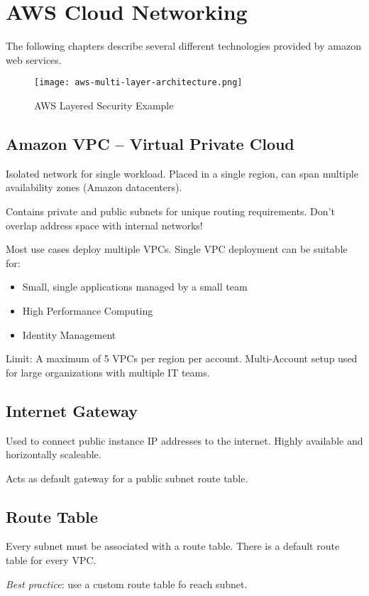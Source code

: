 \section{AWS Cloud Networking}
The following chapters describe several different technologies provided by amazon web services.

\begin{figure}[h]
    \centering
    \texttt{[image: aws-multi-layer-architecture.png]}
    \caption{AWS Layered Security Example}
\end{figure}

\subsection{Amazon VPC -- Virtual Private Cloud}
Isolated network for single workload. Placed in a single region, can span multiple availability zones (Amazon datacenters).

Contains private and public subnets for unique routing requirements. Don't overlap address space with internal networks!

Most use cases deploy multiple VPCs. Single VPC deployment can be suitable for:
\begin{itemize}
    \item Small, single applications managed by a small team
    \item High Performance Computing
    \item Identity Management
\end{itemize}

Limit: A maximum of 5 VPCs per region per account. Multi-Account setup used for large organizations with multiple IT teams.

\subsection{Internet Gateway}

Used to connect public instance IP addresses to the internet. 
Highly available and horizontally scaleable. 

Acts as default gateway for a public subnet route table.

\subsection{Route Table}
Every subnet must be associated with a route table. There is a default route table for every VPC.

\emph{Best practice}: use a custom route table fo reach subnet.

